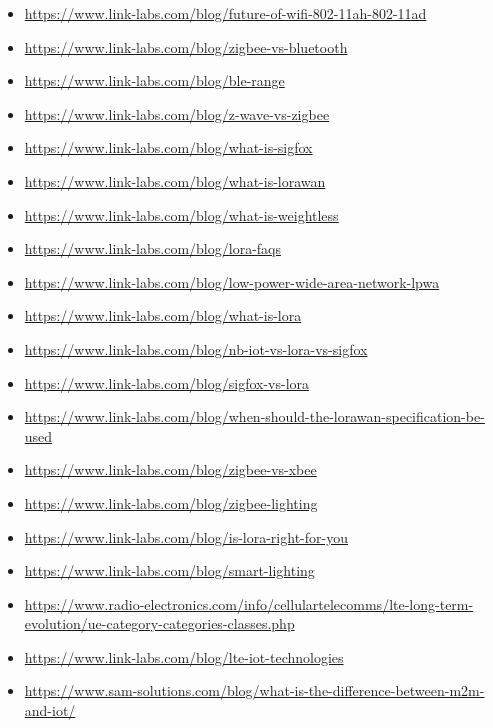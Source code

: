 \documentclass[11pt,a4paper,twoside]{article} %
\begin{document}
{\begin{itemize}
		\item \url{https://www.link-labs.com/blog/future-of-wifi-802-11ah-802-11ad}
		\item \url{https://www.link-labs.com/blog/zigbee-vs-bluetooth}
		\item \url{https://www.link-labs.com/blog/ble-range}
		\item \url{https://www.link-labs.com/blog/z-wave-vs-zigbee}
		\item \url{https://www.link-labs.com/blog/what-is-sigfox}
		\item \url{https://www.link-labs.com/blog/what-is-lorawan}
		\item \url{https://www.link-labs.com/blog/what-is-weightless}
		\item \url{https://www.link-labs.com/blog/lora-faqs}
		\item \url{https://www.link-labs.com/blog/low-power-wide-area-network-lpwa}
		\item \url{https://www.link-labs.com/blog/what-is-lora}
		\item \url{https://www.link-labs.com/blog/nb-iot-vs-lora-vs-sigfox}
		\item \url{https://www.link-labs.com/blog/sigfox-vs-lora}
		\item \url{https://www.link-labs.com/blog/when-should-the-lorawan-specification-be-used}
		\item \url{https://www.link-labs.com/blog/zigbee-vs-xbee}
		\item \url{https://www.link-labs.com/blog/zigbee-lighting}
		\item \url{https://www.link-labs.com/blog/is-lora-right-for-you}
		\item \url{https://www.link-labs.com/blog/smart-lighting}\\
	
		\item \url{https://www.radio-electronics.com/info/cellulartelecomms/lte-long-term-evolution/ue-category-categories-classes.php}
		\item \url{https://www.link-labs.com/blog/lte-iot-technologies}\\

		\item \url{https://www.sam-solutions.com/blog/what-is-the-difference-between-m2m-and-iot/}
	\end{itemize}
}


\clearpage


\end{document}
